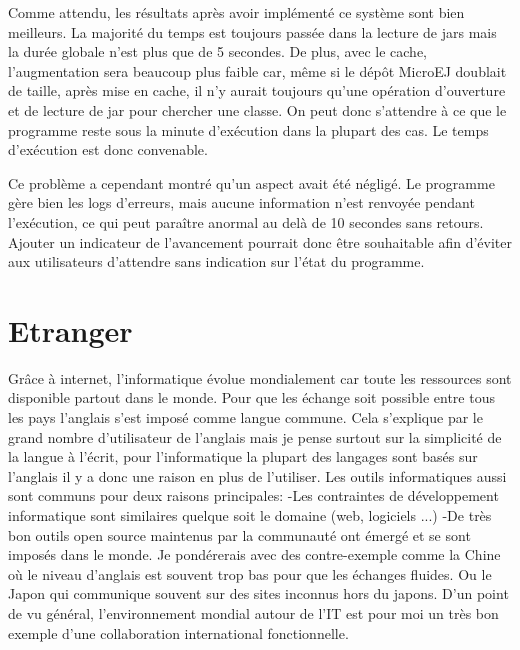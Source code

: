 \documentclass[french,a4paper,12pt]{report}
\begin{document}
Comme attendu, les résultats après avoir implémenté ce système sont bien meilleurs.
La majorité du temps est toujours passée dans la lecture de jars mais la durée globale n’est plus que de 5 secondes. De plus, avec le cache, l’augmentation sera beaucoup plus faible car, même si le dépôt MicroEJ doublait de taille, après mise en cache, il n’y aurait toujours qu’une opération d’ouverture et de lecture de jar pour chercher une classe. On peut donc s’attendre à ce que le programme reste sous la minute d’exécution dans la plupart des cas. Le temps d’exécution est donc convenable.

Ce problème a cependant montré qu'un aspect avait été négligé. Le programme gère bien les logs d’erreurs, mais aucune information n’est renvoyée pendant l’exécution, ce qui peut paraître anormal au delà de 10 secondes sans retours. Ajouter un indicateur de l’avancement pourrait donc être souhaitable afin d’éviter aux utilisateurs d’attendre sans indication sur l’état du programme.


\chapter{Etranger}


Grâce à internet, l’informatique évolue mondialement car toute les ressources sont disponible partout dans le monde. Pour que les échange soit possible entre tous les pays  l’anglais s’est imposé comme langue commune. Cela s’explique par le grand nombre d’utilisateur de l’anglais mais je pense surtout sur la simplicité de la langue à l’écrit, pour l’informatique la plupart des langages sont basés sur l’anglais il y a donc une raison en plus de l’utiliser.
Les outils informatiques aussi sont communs pour deux raisons principales:
-Les contraintes de développement informatique sont similaires quelque soit le domaine (web, logiciels ...)
-De très bon outils open source maintenus par la communauté ont émergé et se sont imposés dans le monde.
Je pondérerais avec des contre-exemple comme la Chine où le niveau d’anglais est souvent trop bas pour que les échanges fluides. Ou le Japon qui communique souvent sur des sites inconnus hors du japons. 
D’un point de vu général, l’environnement mondial autour de l’IT est pour moi un très bon exemple d’une collaboration international fonctionnelle.\\
\end{document}
